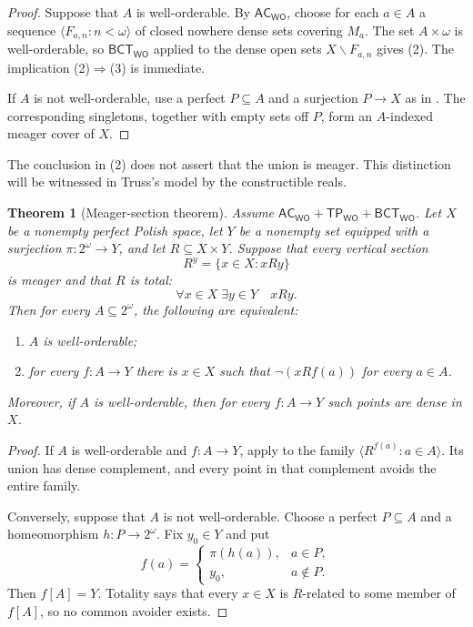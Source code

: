 \documentclass[11pt,reqno]{amsart}
\newcommand{\WO}{\mathsf{WO}}
\newcommand{\BCTWO}{\mathsf{BCT}_{\WO}}
\newcommand{\TP}{\mathsf{TP}_{\WO}}
\theoremstyle{plain}
\newtheorem{theorem}{Theorem}[section]
\theoremstyle{definition}
\theoremstyle{remark}
\begin{document}
\begin{proof}
Suppose that $A$ is well-orderable.  By $\mathsf{AC}_{\WO}$, choose for each
$a\in A$ a sequence $\langle F_{a,n}:n<\omega\rangle$ of closed nowhere
dense sets covering $M_a$.  The set $A\times\omega$ is well-orderable, so
$\BCTWO$ applied to the dense open sets $X\smallsetminus F_{a,n}$ gives (2).
The implication (2)$\Rightarrow$(3) is immediate.

If $A$ is not well-orderable, use a perfect $P\subseteq A$ and a surjection
$P\to X$ as in .  The corresponding singletons,
together with empty sets off $P$, form an $A$-indexed meager cover of $X$.
\end{proof}

The conclusion in (2) does not assert that the union is meager.  This
distinction will be witnessed in Truss's model by the constructible reals.

\begin{theorem}[Meager-section theorem]\label{thm:meager-section}
Assume $\mathsf{AC}_{\WO}+\TP+\BCTWO$.  Let $X$ be a nonempty perfect
Polish space, let $Y$ be a nonempty set equipped with a surjection
$\pi:2^\omega\to Y$, and let $R\subseteq X\times Y$.  Suppose that every
vertical section
\[
 R^y=\{x\in X:xRy\}
\]
is meager and that $R$ is total:
\[
 \forall x\in X\;\exists y\in Y\quad xRy.
\]
Then for every $A\subseteq2^\omega$, the following are equivalent:
\begin{enumerate}
\item $A$ is well-orderable;
\item for every $f:A\to Y$ there is $x\in X$ such that
$\neg(xRf(a))$ for every $a\in A$.
\end{enumerate}
Moreover, if $A$ is well-orderable, then for every $f:A\to Y$ such points are dense in $X$.
\end{theorem}

\begin{proof}
If $A$ is well-orderable and $f:A\to Y$, apply
 to the family $\langle R^{f(a)}:a\in A\rangle$. Its union has dense complement, and every point in that complement avoids the entire family.

Conversely, suppose that $A$ is not well-orderable.  Choose a perfect $P\subseteq A$ and a homeomorphism $h:P\to2^\omega$.  Fix $y_0\in Y$ and put
\[
 f(a)=
 \begin{cases}
 \pi(h(a)),&a\in P,\\
 y_0,&a\notin P.
 \end{cases}
\]
Then $f[A]=Y$.  Totality says that every $x\in X$ is $R$-related to some member of $f[A]$, so no common avoider exists.
\end{proof}
\end{document}
